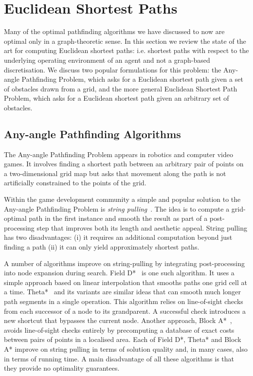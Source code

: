 \section{Euclidean Shortest Paths}
\label{cha::lit::euclidean}
Many of the optimal pathfinding algorithms we have discussed to now are
optimal only in a graph-theoretic sense. In this section we review the state
of the art for computing Euclidean shortest paths: i.e. shortest paths with
respect to the underlying operating environment of an agent and not a
graph-based discretisation. We discuss two popular formulations for this
problem: the Any-angle Pathfinding Problem, which asks for a Euclidean
shortest path given a set of obstacles drawn from a grid, and the more general
Euclidean Shortest Path Problem, which asks for a Euclidean shortest path
given an arbitrary set of obstacles.

\subsection{Any-angle Pathfinding Algorithms}
\label{cha::lit::euclidean:anyangle}
The Any-angle Pathfinding Problem appears in robotics and computer video
games. It involves finding a shortest path between an arbitrary pair of points
on a two-dimensional grid map but asks that movement along the path is not
artificially constrained to the points of the grid.

Within the game development community a simple and popular solution to the
Any-angle Pathfinding Problem is \emph{string
pulling}~\citep{pinter01,botea04}.  The idea is to compute a grid-optimal path
in the first instance and smooth the result as part of a post-processing step
that improves both its length and aesthetic appeal. String pulling has two
disadvantages: (i) it requires an additional computation beyond just finding a
path (ii) it can only yield approximately shortest paths.

A number of algorithms improve on string-pulling by integrating
post-processing into node expansion during search. Field D{*}~\citep{ferguson05}
is one such algorithm. It uses a simple approach based on linear interpolation
that smooths paths one grid cell at a time.  Theta{*}~\citep{nash07} and its
variants \citep{nash09,nash10,munoz12} are similar ideas that can smooth much
longer path segments in a single operation. This algorithm relies on
line-of-sight checks from each successor of a node to its grandparent. A
successful check introduces a new shortcut that bypasses the current node.
Another approach, Block A{*}~\citep{yap11}, avoids line-of-sight checks entirely
by precomputing a database of exact costs between pairs of points in a
localised area.  Each of Field D{*}, Theta{*} and Block A{*} improve on string
pulling in terms of solution quality and, in many cases, also in terms of
running time.  A main disadvantage of all these algorithms is that they
provide no optimality guarantees.

